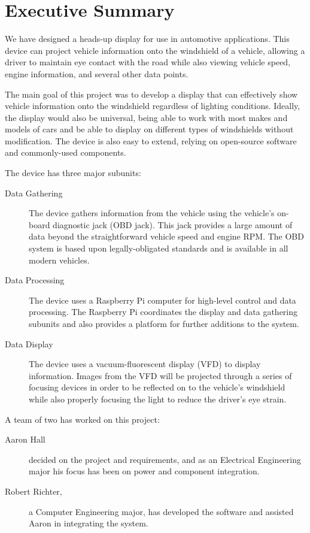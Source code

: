 \chapter{Executive Summary}


We have designed a heads-up display for use in automotive applications.
This device can project vehicle information onto the
windshield of a vehicle, allowing a driver to maintain eye contact
with the road while also viewing vehicle speed, engine information, and
several other data points.

The main goal of this project was to develop a display that can
effectively show vehicle information onto the windshield regardless of
lighting conditions. Ideally, the display would also be universal, being able
to work with most makes and models of cars and be able to display on
different types of windshields without modification. The device is also
easy to extend, relying on open-source software and commonly-used components.

The device has three major subunits:

\begin{description}
\item[Data Gathering] The device gathers information from the
vehicle using the vehicle's on-board diagnostic jack (OBD jack). This jack
provides a large amount of data beyond the straightforward vehicle speed and
engine RPM. The OBD system is based upon legally-obligated standards and is
available in all modern vehicles.
\item[Data Processing] The device uses a Raspberry Pi computer for high-level
control and data processing. The Raspberry Pi coordinates the display and
data gathering subunits and also provides a platform for further additions to
the system. 
\item[Data Display] The device uses a vacuum-fluorescent display (VFD) to
display information. Images from the VFD will be projected through a series of
focusing devices in order to be reflected on to the vehicle's windshield while
also properly focusing the light to reduce the driver's eye strain.
\end{description}

A team of two has worked on this project:

\begin{description}
\item[Aaron Hall] decided on the project and requirements, and as an Electrical
Engineering major his focus has been on power and component integration.
\item[Robert Richter,] a Computer Engineering
major, has developed the software and assisted Aaron in integrating the system.
\end{description}
